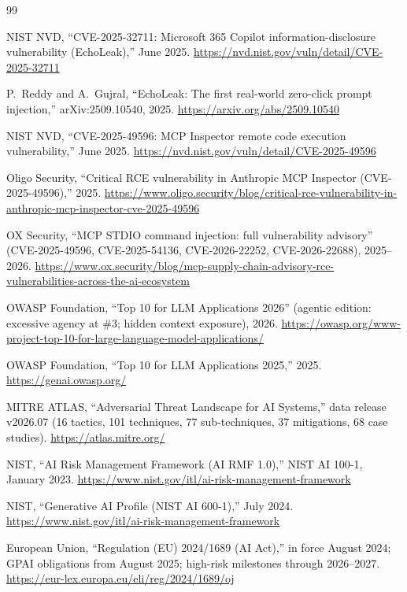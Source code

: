 \begin{thebibliography}{99}\small\raggedright

 NIST NVD, ``CVE-2025-32711: Microsoft 365 Copilot
information-disclosure vulnerability (EchoLeak),'' June 2025.
\url{https://nvd.nist.gov/vuln/detail/CVE-2025-32711}

 P.~Reddy and A.~Gujral, ``EchoLeak: The first
real-world zero-click prompt injection,'' arXiv:2509.10540, 2025.
\url{https://arxiv.org/abs/2509.10540}

 NIST NVD, ``CVE-2025-49596: MCP Inspector remote code
execution vulnerability,'' June 2025.
\url{https://nvd.nist.gov/vuln/detail/CVE-2025-49596}

 Oligo Security, ``Critical RCE vulnerability in Anthropic
MCP Inspector (CVE-2025-49596),'' 2025.
\url{https://www.oligo.security/blog/critical-rce-vulnerability-in-anthropic-mcp-inspector-cve-2025-49596}

 OX Security, ``MCP STDIO command injection: full
vulnerability advisory'' (CVE-2025-49596, CVE-2025-54136, CVE-2026-22252,
CVE-2026-22688), 2025--2026.
\url{https://www.ox.security/blog/mcp-supply-chain-advisory-rce-vulnerabilities-across-the-ai-ecosystem}

 OWASP Foundation, ``Top 10 for LLM Applications 2026''
(agentic edition: excessive agency at \#3; hidden context exposure), 2026.
\url{https://owasp.org/www-project-top-10-for-large-language-model-applications/}

 OWASP Foundation, ``Top 10 for LLM Applications 2025,''
2025. \url{https://genai.owasp.org/}

 MITRE ATLAS, ``Adversarial Threat Landscape for AI Systems,''
data release v2026.07 (16 tactics, 101 techniques, 77 sub-techniques,
37 mitigations, 68 case studies).
\url{https://atlas.mitre.org/}

 NIST, ``AI Risk Management Framework (AI RMF 1.0),''
NIST AI 100-1, January 2023. \url{https://www.nist.gov/itl/ai-risk-management-framework}

 NIST, ``Generative AI Profile (NIST AI 600-1),'' July 2024.
\url{https://www.nist.gov/itl/ai-risk-management-framework}

 European Union, ``Regulation (EU) 2024/1689 (AI Act),'' in
force August 2024; GPAI obligations from August 2025; high-risk milestones
through 2026--2027. \url{https://eur-lex.europa.eu/eli/reg/2024/1689/oj}


\end{thebibliography}
